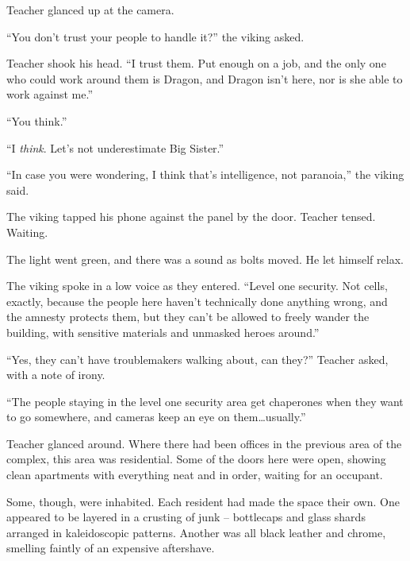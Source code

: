 Teacher glanced up at the camera.



``You don't trust your people to handle it?''  the viking asked.



Teacher shook his head.  ``I trust them.  Put enough on a job, and the only one who could work around them is Dragon, and Dragon isn't here, nor is she able to work against me.''



``You think.''



``I \emph{think}.  Let's not underestimate Big Sister.''



``In case you were wondering, I think that's intelligence, not paranoia,'' the viking said.



The viking tapped his phone against the panel by the door.  Teacher tensed.  Waiting.



The light went green, and there was a sound as bolts moved.  He let himself relax.



The viking spoke in a low voice as they entered.  ``Level one security.  Not cells, exactly, because the people here haven't technically done anything wrong, and the amnesty protects them, but they can't be allowed to freely wander the building, with sensitive materials and unmasked heroes around.''



``Yes, they can't have troublemakers walking about, can they?''  Teacher asked, with a note of irony.



``The people staying in the level one security area get chaperones when they want to go somewhere, and cameras keep an eye on them\ldots usually.''



Teacher glanced around.  Where there had been offices in the previous area of the complex, this area was residential.  Some of the doors here were open, showing clean apartments with everything neat and in order, waiting for an occupant.



Some, though, were inhabited.  Each resident had made the space their own.  One appeared to be layered in a crusting of junk – bottlecaps and glass shards arranged in kaleidoscopic patterns.  Another was all black leather and chrome, smelling faintly of an expensive aftershave.



